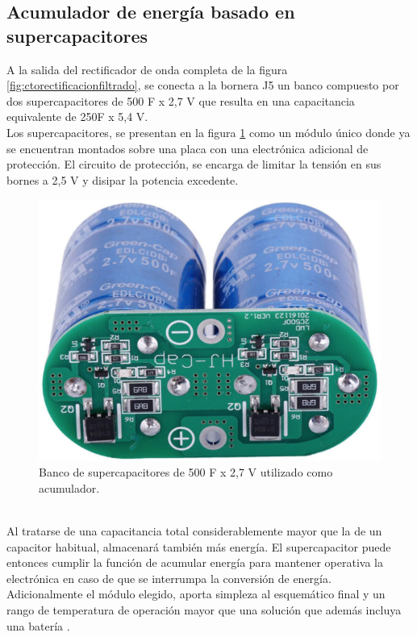 \subsection{Acumulador de energía basado en supercapacitores}
A la salida del rectificador de onda completa de la figura \ref{fig:ctorectificacionfiltrado}, se conecta a la bornera J5 un banco compuesto por dos supercapacitores de 500 F x 2,7 V que resulta en una capacitancia equivalente de 250F x 5,4 V.\\
Los supercapacitores, se presentan en la figura \ref{fig:imagensupercap} como un módulo único donde ya se encuentran montados sobre una placa con una electrónica adicional de protección. El circuito de protección, se encarga de limitar la tensión en sus bornes a 2,5 V y disipar la potencia excedente.\\
\begin{figure}[h]
	\centering
	\includegraphics[width=0.6\linewidth]{Figures/imagen_supercap}
	\caption{Banco de supercapacitores de 500 F x 2,7 V utilizado como acumulador.}
	\label{fig:imagensupercap}
\end{figure}\\
Al tratarse de una capacitancia total considerablemente mayor que la de un capacitor habitual, almacenará también más energía. El supercapacitor puede entonces cumplir la función de acumular energía para mantener operativa la electrónica en caso de que se interrumpa la conversión de energía.\\
Adicionalmente el módulo elegido, aporta simpleza al esquemático final y un rango de temperatura de operación mayor que una solución que además incluya una batería \citep{PORCARELLI20141671}.\\

